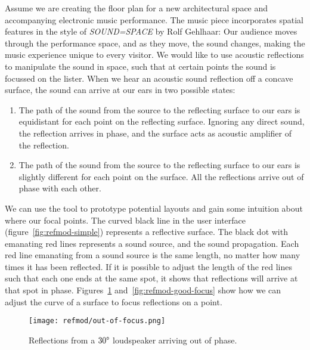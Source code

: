 Assume we are creating the floor plan for a new architectural space
and accompanying electronic music performance. The music piece
incorporates spatial features in the style of \textit{SOUND=SPACE} by
Rolf Gehlhaar: Our audience moves through the performance space, and
as they move, the sound changes, making the music experience unique to
every visitor. We would like to use acoustic reflections to manipulate
the sound in space, such that at certain points the sound is
focussed on the lister. When we hear an acoustic sound reflection off
a concave surface, the sound can arrive at our ears in two possible
states:
\begin{enumerate}
\item The path of the sound from the source to the reflecting surface
  to our ears is equidistant for each point on the reflecting
  surface. Ignoring any direct sound, the reflection arrives in phase,
  and the surface acts as acoustic amplifier of the reflection.
\item The path of the sound from the source to the reflecting surface
  to our ears is slightly different for each point on the surface. All
  the reflections arrive out of phase with each other.
\end{enumerate}
We can use the  tool to prototype potential layouts and gain some
intuition about where our focal points. The curved black line in the
user interface (figure~\ref{fig:refmod-simple}) represents a
reflective surface. The black dot with emanating red lines represents
a sound source, and the sound propagation.  Each red line emanating
from a sound source is the same length, no matter how many times it
has been reflected. If it is possible to adjust the length of the red
lines such that each one ends at the same spot, it shows that
reflections will arrive at that spot in
phase. Figures~\ref{fig:refmod-bad-focus}
and~\ref{fig:refmod-good-focus} show how we can adjust the curve of a
surface to focus reflections on a point.

\begin{figure}[]
  \texttt{[image: refmod/out-of-focus.png]}
  \caption[]{Reflections from a $30\degree$ loudspeaker arriving out of phase.}
  \label{fig:refmod-bad-focus}
\end{figure}

